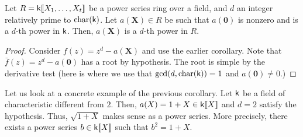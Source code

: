 \begin{cor}
	Let $R = \mathsf{k}[\![X_{1}, \ldots, X_{t}]\!]$ be a power series ring over a field, and $d$ an integer relatively prime to $\operatorname{char}(\mathsf{k})$. Let $a(\mathbf{X}) \in R$ be such that $a(\mathbf{0})$ is nonzero and is a $d$-th power in $\mathsf{k}$. Then, $a(\mathbf{X})$ is a $d$-th power in $R$.
\end{cor}
\begin{proof} 
	Consider $f(z) = z^{d} - a(\mathbf{X})$ and use the earlier corollary. Note that $\bar{f}(z) = z^{d} - a(\mathbf{0})$ has a root by hypothesis. The root is simple by the derivative test (here is where we use that $\gcd(d, \operatorname{char}(\mathsf{k})) = 1$ and $a(\mathbf{0}) \neq 0$.)
\end{proof}

\begin{ex}
	Let us look at a concrete example of the previous corollary. Let $\mathsf{k}$ be a field of characteristic different from $2$. Then, $a(X) = 1 + X \in \mathsf{k}[\![X]\!]$ and $d = 2$ satisfy the hypothesis. Thus, $\sqrt{1 + X}$ makes sense as a power series. More precisely, there exists a power series $b \in \mathsf{k} [\![X]\!]$ such that $b^{2} = 1 + X$.
\end{ex}
